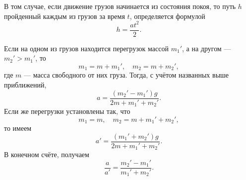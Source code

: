 В том случае, если движение грузов начинается из состояния покоя, то путь $h$ пройденный каждым из грузов за время $t$, определяется формулой
\begin{equation}
h=\frac{at^2}{2}.
\end{equation}

Если на одном из грузов находится перегрузок массой $m_1'$, а на другом --- $m_2'>m_1'$, то
\begin{equation}
m_1=m+m_1',\quad m_2=m+m_2',
\end{equation}
где $m$ --- масса свободного от них груза. Тогда, с учётом названных выше приближений,
\begin{equation}
a=\frac{\left(m_2'-m_1'\right)g}{2m+m_1'+m_2'}.
\end{equation}
Если же перегрузки установлены так, что
\begin{equation}
m_1=m,\quad m_2=m+m_1'+m_2',
\end{equation}
то имеем
\begin{equation}
a'=\frac{\left(m_1'+m_2'\right)g}{2m+m_1'+m_2'}.
\end{equation}
В конечном счёте, получаем
\begin{equation}\label{EqTwentysix}
\frac{a}{a'}=\frac{m_2'-m_1'}{m_1'+m_2'}.
\end{equation}